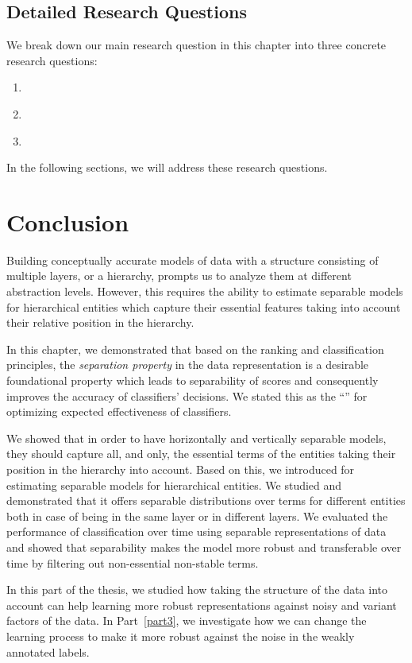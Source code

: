 \subsection{Detailed Research Questions}
We break down our main research question in this chapter into three concrete research questions:
\begin{resqbox}
\begin{enumerate}
\item[\textbf{\resqname{c3.1}}] \emph{}
\item[\textbf{\resqname{c3.2}}] \emph{}
\item[\textbf{\resqname{c3.3}}] \emph{}
\end{enumerate}
\end{resqbox}
In the following sections, we will address these research questions.







\section{Conclusion}
Building conceptually accurate models of data with a structure consisting of multiple layers, or a hierarchy, prompts us to analyze them at different abstraction levels.  However, this requires the ability to estimate separable models for hierarchical entities which capture their essential features taking into account their relative position in the hierarchy. 

In this chapter, we demonstrated that based on the ranking and classification principles, the \emph{separation property} in the data representation is a desirable foundational property which leads to separability of scores and consequently improves the accuracy of classifiers' decisions.  We stated this as the ``\ssp'' for optimizing expected effectiveness of classifiers.

We showed that in order to have horizontally and vertically separable models, they should capture all, and only, the essential terms of the entities taking their position in the hierarchy into account. Based on this, we introduced \hswlms for estimating separable models for hierarchical entities. We studied \achswlm and demonstrated that it offers separable distributions over terms for different entities both in case of being in the same layer or in different layers.  We evaluated the performance of classification over time using separable representations of data and showed that separability makes the model more robust and transferable over time by filtering out non-essential non-stable terms.

In this part of the thesis, we studied how taking the structure of the data into account can help learning more robust representations against noisy and variant factors of the data. In Part~\ref{part3}, we investigate how we can change the learning process to make it more robust against the noise in the weakly annotated labels.